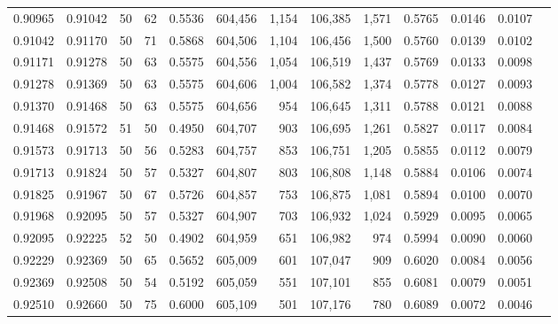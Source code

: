 \begin{tabular}{rrrrrrrrrrrrr}
0.90965 & 0.91042 &    50 &  62 &                                     0.5536 & 604,456 &   1,154 & 106,385 &   1,571 & 0.5765 & 0.0146 & 0.0107 \\
0.91042 & 0.91170 &    50 &  71 &                                     0.5868 & 604,506 &   1,104 & 106,456 &   1,500 & 0.5760 & 0.0139 & 0.0102 \\
0.91171 & 0.91278 &    50 &  63 &                                     0.5575 & 604,556 &   1,054 & 106,519 &   1,437 & 0.5769 & 0.0133 & 0.0098 \\
0.91278 & 0.91369 &    50 &  63 &                                     0.5575 & 604,606 &   1,004 & 106,582 &   1,374 & 0.5778 & 0.0127 & 0.0093 \\
0.91370 & 0.91468 &    50 &  63 &                                     0.5575 & 604,656 &     954 & 106,645 &   1,311 & 0.5788 & 0.0121 & 0.0088 \\
0.91468 & 0.91572 &    51 &  50 &                                     0.4950 & 604,707 &     903 & 106,695 &   1,261 & 0.5827 & 0.0117 & 0.0084 \\
0.91573 & 0.91713 &    50 &  56 &                                     0.5283 & 604,757 &     853 & 106,751 &   1,205 & 0.5855 & 0.0112 & 0.0079 \\
0.91713 & 0.91824 &    50 &  57 &                                     0.5327 & 604,807 &     803 & 106,808 &   1,148 & 0.5884 & 0.0106 & 0.0074 \\
0.91825 & 0.91967 &    50 &  67 &                                     0.5726 & 604,857 &     753 & 106,875 &   1,081 & 0.5894 & 0.0100 & 0.0070 \\
0.91968 & 0.92095 &    50 &  57 &                                     0.5327 & 604,907 &     703 & 106,932 &   1,024 & 0.5929 & 0.0095 & 0.0065 \\
0.92095 & 0.92225 &    52 &  50 &                                     0.4902 & 604,959 &     651 & 106,982 &     974 & 0.5994 & 0.0090 & 0.0060 \\
0.92229 & 0.92369 &    50 &  65 &                                     0.5652 & 605,009 &     601 & 107,047 &     909 & 0.6020 & 0.0084 & 0.0056 \\
0.92369 & 0.92508 &    50 &  54 &                                     0.5192 & 605,059 &     551 & 107,101 &     855 & 0.6081 & 0.0079 & 0.0051 \\
0.92510 & 0.92660 &    50 &  75 &                                     0.6000 & 605,109 &     501 & 107,176 &     780 & 0.6089 & 0.0072 & 0.0046 \\

\end{tabular}
